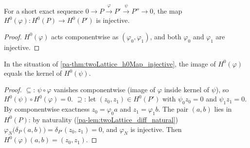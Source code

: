 \begin{theorem}
  \label{pa-thm:twoLattice_h0Map_injective}
  \leanok

  For a short exact sequence \(0 \to P \xrightarrow{\varphi} P' \xrightarrow{\psi}
  P'' \to 0\), the map \(H^0(\varphi) : H^0(P) \to H^0(P')\) is injective.
\end{theorem}
\begin{proof}
  \leanok
  \(H^0(\varphi)\) acts componentwise as \((\varphi_0, \varphi_1)\), and both
  \(\varphi_0\) and \(\varphi_1\) are injective.
\end{proof}

\begin{theorem}
  \label{pa-thm:twoLattice_exact_h0_middle}
  \leanok

  In the situation of \ref{pa-thm:twoLattice_h0Map_injective}, the image of
  \(H^0(\varphi)\) equals the kernel of \(H^0(\psi)\).
\end{theorem}
\begin{proof}
  \leanok
  \(\subseteq\): \(\psi \circ \varphi\) vanishes componentwise (image of \(\varphi\)
  inside kernel of \(\psi\)), so \(H^0(\psi) \circ H^0(\varphi) = 0\).
  \(\supseteq\): let \((z_0, z_1) \in H^0(P')\) with \(\psi_0 z_0 = 0\) and
  \(\psi_1 z_1 = 0\). By componentwise exactness \(z_0 = \varphi_0 a\) and
  \(z_1 = \varphi_1 b\). The pair \((a, b)\) lies in \(H^0(P)\): by naturality
  (\ref{pa-lem:twoLattice_diff_natural})
  \(\varphi_N\bigl(\delta_P(a,b)\bigr) = \delta_{P'}(z_0, z_1) = 0\), and
  \(\varphi_N\) is injective. Then \(H^0(\varphi)(a, b) = (z_0, z_1)\).
\end{proof}

